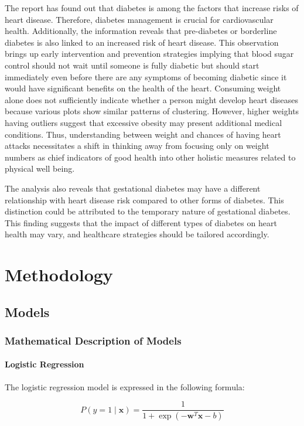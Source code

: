 \documentclass[12pt, a4paper,twoside]{report}
\numberwithin{equation}{chapter}
\begin{document}
The report has found out that diabetes is among the factors that increase risks of heart disease. Therefore, diabetes management is crucial for cardiovascular health.
Additionally, the information reveals that pre-diabetes or borderline diabetes is also linked to an increased risk of heart disease. This observation brings up early intervention and prevention strategies implying that blood sugar control should not wait until someone is fully diabetic but should start immediately even before there are any symptoms of becoming diabetic since it would have significant benefits on the health of the heart.
Consuming weight alone does not sufficiently indicate whether a person might develop heart diseases because various plots show similar patterns of clustering. However, higher weights having outliers suggest that excessive obesity may present additional medical conditions. Thus, understanding between weight and chances of having heart attacks necessitates a shift in thinking away from focusing only on weight numbers as chief indicators of good health into other holistic measures related to physical well being.

The analysis also reveals that gestational diabetes may have a different relationship with heart disease risk compared to other forms of diabetes. This distinction could be attributed to the temporary nature of gestational diabetes. This finding suggests that the impact of different types of diabetes on heart health may vary, and healthcare strategies should be tailored accordingly.

\chapter{Methodology}
\section{Models}
\subsection{Mathematical Description of Models}
\subsubsection{Logistic Regression}

The logistic regression model is expressed in the following formula:

\[P(y = 1 \mid \mathbf{x}) = \frac{1}{1 + \exp(-\mathbf{w}^T \mathbf{x} - b)}\]
\end{document}
